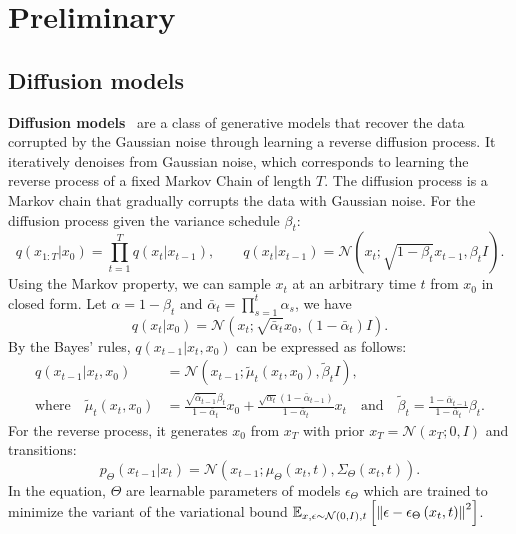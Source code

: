 \section{Preliminary}
\subsection{Diffusion models}
\label{appendix:preliminary}
\textbf{Diffusion models}~\citep{ho2020denoising} are a class of generative models that recover the data corrupted by the Gaussian noise through learning a reverse diffusion process.
It iteratively denoises from Gaussian noise, which corresponds to learning the reverse process of a fixed Markov Chain of length $T$.
The diffusion process is a Markov chain that gradually corrupts the data with Gaussian noise.
For the diffusion process given the variance schedule $\beta_t$:
\begin{equation}
q(x_{1:T} | x_0) = \prod_{t=1}^T q(x_t | x_{t-1} ), \qquad q(x_t|x_{t-1}) = \mathcal{N}(x_t;\sqrt{1-\beta_t}x_{t-1},\beta_t I).
\end{equation}
Using the  Markov property, we can sample $x_t$ at an arbitrary time $t$ from $x_0$ in closed form. Let $\alpha=1-\beta_t$ and $\bar{\alpha}_t=\prod_{s=1}^t\alpha_s$, we have
\begin{equation}
    q(x_t|x_0) = \mathcal{N}(x_t; \sqrt{\bar\alpha_t}x_0, (1-\bar\alpha_t)I).
\end{equation}
By the Bayes' rules, $q(x_{t-1}|x_t,x_0)$ can be expressed as follows:
\begin{align}
q(x_{t-1}|x_t,x_0) &=  \mathcal{N}(x_{t-1}; \tilde\mu_t(x_t, x_0), \tilde\beta_t I), \\
\text{where}\quad \tilde\mu_t(x_t, x_0) &= \frac{\sqrt{\bar\alpha_{t-1}}\beta_t }{1-\bar\alpha_t}x_0 + \frac{\sqrt{\alpha_t}(1- \bar\alpha_{t-1})}{1-\bar\alpha_t} x_t \quad \text{and} \quad
\tilde\beta_t = \frac{1-\bar\alpha_{t-1}}{1-\bar\alpha_t}\beta_t.
\end{align}
For the reverse process, it generates $x_0$ from $x_T$ with prior $x_T=\mathcal{N}(x_T;0,I)$ and transitions:
\begin{equation}
    p_\Theta(x_{t-1}|x_t)=\mathcal{N}(x_{t-1};\mu_\Theta(x_t, t),\Sigma_\Theta(x_t,t)).
\end{equation}
In the equation, $\Theta$ are learnable parameters of models $\epsilon_\Theta$ 
which are trained to minimize the variant of the variational bound $\mathbb{E}_{x,\epsilon\sim\mathcal{N}(0,I),t}\left[ \left\| \epsilon-\epsilon_{\Theta}\left(x_t, t\right) \right\|^2 \right]$.


